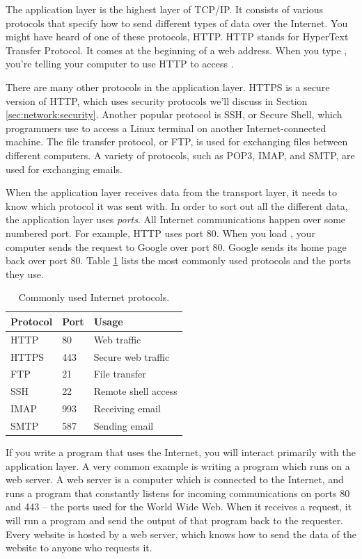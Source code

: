 The application layer is the highest layer of TCP/IP. It consists of various protocols that specify how to send different types of data over the Internet. You might have heard of one of these protocols, HTTP. HTTP stands for HyperText Transfer Protocol. It comes at the beginning of a web address. When you type , you're telling your computer to use HTTP to access .

There are many other protocols in the application layer. HTTPS is a secure version of HTTP, which uses security protocols we'll discuss in Section \ref{sec:network:security}. Another popular protocol is SSH, or Secure Shell, which programmers use to access a Linux terminal on another Internet-connected machine. The file transfer protocol, or FTP, is used for exchanging files between different computers. A variety of protocols, such as POP3, IMAP, and SMTP, are used for exchanging emails.

When the application layer receives data from the transport layer, it needs to know which protocol it was sent with. In order to sort out all the different data, the application layer uses \emph{ports}. All Internet communications happen over some numbered port. For example, HTTP uses port 80. When you load , your computer sends the request to Google over port 80. Google sends its home page back over port 80. Table \ref{tab:common_ports} lists the most commonly used protocols and the ports they use.

\begin{table}
    \centering
    \begin{tabular}{lll}
        Protocol & Port & Usage \\
        \hline
        HTTP & 80 & Web traffic \\
        HTTPS & 443 & Secure web traffic \\
        FTP & 21 & File transfer \\
        SSH & 22 & Remote shell access \\
        IMAP & 993 & Receiving email \\
        SMTP & 587 & Sending email
    \end{tabular}
    \caption{Commonly used Internet protocols.}
    \label{tab:common_ports}
\end{table}

If you write a program that uses the Internet, you will interact primarily with the application layer. A very common example is writing a program which runs on a web server. A web server is a computer which is connected to the Internet, and runs a program that constantly listens for incoming communications on ports 80 and 443 -- the ports used for the World Wide Web. When it receives a request, it will run a program and send the output of that program back to the requester. Every website is hosted by a web server, which knows how to send the data of the website to anyone who requests it.

